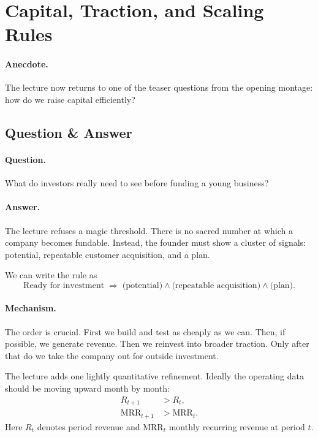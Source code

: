\section{Capital, Traction, and Scaling Rules}

\paragraph{Anecdote.} The lecture now returns to one of the teaser questions from the opening montage: how do we raise capital efficiently?

\subsection{Question \& Answer}

\paragraph{Question.} What do investors really need to see before funding a young business?

\paragraph{Answer.} The lecture refuses a magic threshold. There is no sacred number at which a company becomes fundable. Instead, the founder must show a cluster of signals: potential, repeatable customer acquisition, and a plan.

We can write the rule as
\begin{equation}
\text{Ready for investment}
\;\Rightarrow\;
\bigl(\text{potential}\bigr)
\land
\bigl(\text{repeatable acquisition}\bigr)
\land
\bigl(\text{plan}\bigr).
\end{equation}

\paragraph{Mechanism.} The order is crucial. First we build and test as cheaply as we can. Then, if possible, we generate revenue. Then we reinvest into broader traction. Only after that do we take the company out for outside investment.

The lecture adds one lightly quantitative refinement. Ideally the operating data should be moving upward month by month:
\begin{align}
R_{t+1} &> R_t,\\
\mathrm{MRR}_{t+1} &> \mathrm{MRR}_t.
\end{align}
Here \(R_t\) denotes period revenue and \(\mathrm{MRR}_t\) monthly recurring revenue at period \(t\).

